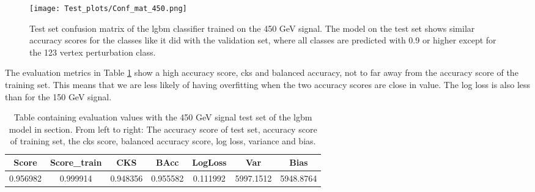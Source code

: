 \documentclass[a4paper, american, 12pt]{report}
\begin{document}
	\begin{figure}[htb!]
		\centering\texttt{[image: Test\_plots/Conf\_mat\_450.png]}
		\caption[Test set confusion matrix for the \acrshort{lgbm} model trained on the 150 GeV signal.]{Test set confusion matrix of the \acrshort{lgbm} classifier trained on the 450 GeV signal. The model on the test set shows similar accuracy scores for the classes like it did with the validation set, where all classes are predicted with 0.9 or higher except for the 123 vertex perturbation class. \label{fig:ConfTest_450}}
	\end{figure}
	
	The evaluation metrics in Table \ref{tab:Test_450} show a high accuracy score, \acrshort{cks} and balanced accuracy, not to far away from the accuracy score of the training set. This means that we are less likely of having overfitting when the two accuracy scores are close in value. The log loss is also less than for the 150 GeV signal.
	\begin{table}[htb!]
		\hspace{-0.8cm}
		\begin{tabular}{ |c|c|c|c|c|c|c| }
			\hline \rule{0pt}{13pt}
			Score & Score\_train & CKS & BAcc & LogLoss & Var & Bias \\
			\hline \rule{0pt}{13pt}
			0.956982 & 0.999914 & 0.948356 & 0.955582 &  0.111992 & 5997.1512 & 5948.8764 \\
			\hline
		\end{tabular}	         
		\caption[Evaluation with 450 Gev signal test set.]{Table containing evaluation values with the 450 GeV signal test set of the \acrshort{lgbm} model in section. From left to right: The accuracy score of test set, accuracy score of training set, the \acrshort{cks} score, balanced accuracy score, log loss, variance and bias.}
		\label{tab:Test_450}
	\end{table}
	
\end{document}
